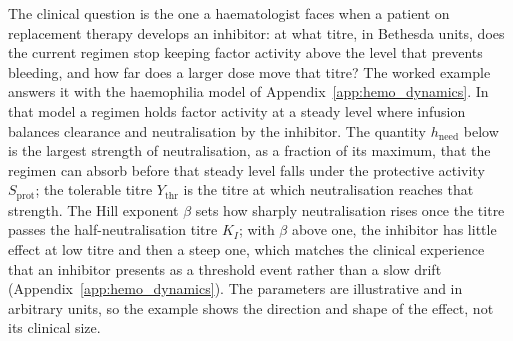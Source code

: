 The clinical question is the one a haematologist faces when a patient on
replacement therapy develops an inhibitor: at what titre, in Bethesda units,
does the current regimen stop keeping factor activity above the level that
prevents bleeding, and how far does a larger dose move that titre? The worked
example answers it with the haemophilia model of
Appendix~\ref{app:hemo_dynamics}. In that model a regimen holds factor activity
at a steady level where infusion balances clearance and neutralisation by the
inhibitor. The quantity $h_{\text{need}}$ below is the largest strength of
neutralisation, as a fraction of its maximum, that the regimen can absorb
before that steady level falls under the protective activity $S_{\text{prot}}$;
the tolerable titre $Y_{\text{thr}}$ is the titre at which neutralisation
reaches that strength. The Hill exponent
$\beta$ sets how sharply neutralisation rises once the titre passes the
half-neutralisation titre $K_I$; with $\beta$ above one, the inhibitor has
little effect at low titre and then a steep one, which matches the clinical
experience that an inhibitor presents as a threshold event rather than a slow
drift (Appendix~\ref{app:hemo_dynamics}). The parameters are illustrative and
in arbitrary units, so the example shows the direction and shape of the effect,
not its clinical size.

